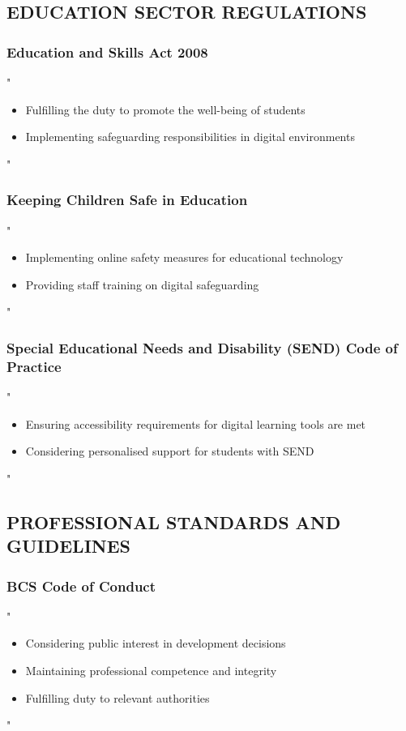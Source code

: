 \documentclass[14pt,a4paper]{article}
\begin{document}
\textit{\parencite{FTC2023}}

\subsection*{EDUCATION SECTOR REGULATIONS}

\subsubsection*{Education and Skills Act 2008}
"
\begin{itemize}
    \item Fulfilling the duty to promote the well-being of students
    \item Implementing safeguarding responsibilities in digital environments
\end{itemize}
"

\textit{\parencite{UKGov2008}}


\subsubsection*{Keeping Children Safe in Education}
"
\begin{itemize}
    \item Implementing online safety measures for educational technology
    \item Providing staff training on digital safeguarding
\end{itemize}
"

\textit{\parencite{DfE2024a}}

\subsubsection*{Special Educational Needs and Disability (SEND) Code of Practice}
"
\begin{itemize}
    \item Ensuring accessibility requirements for digital learning tools are met
    \item Considering personalised support for students with SEND
\end{itemize}
"

\textit{\parencite{DfE2024b}}


\subsection*{PROFESSIONAL STANDARDS AND GUIDELINES}

\subsubsection*{BCS Code of Conduct}
"
\begin{itemize}
    \item Considering public interest in development decisions
    \item Maintaining professional competence and integrity
    \item Fulfilling duty to relevant authorities
\end{itemize}
"
\end{document}
